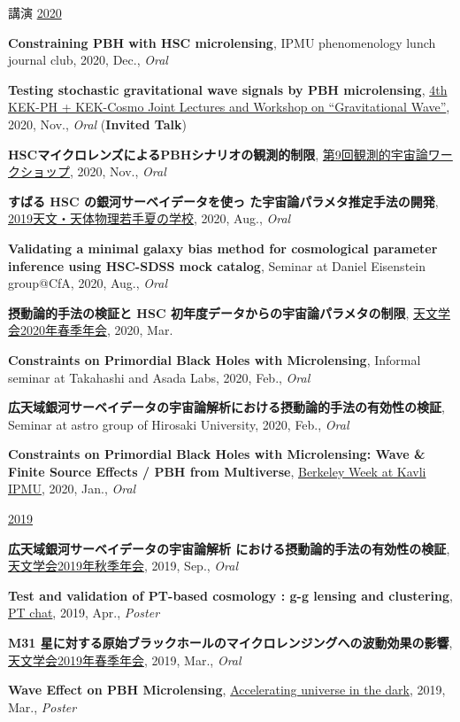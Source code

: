 \begin{rSection}{講演}
\underline{2020}
\begin{etaremune}
\setcounter{enumi}{16}
\item \textbf{Constraining PBH with HSC microlensing}, IPMU phenomenology lunch journal club, 2020, Dec., \textit{Oral}
\item \textbf{Testing stochastic gravitational wave signals by PBH microlensing}, \href{http://conference-indico.kek.jp/event/117/timetable/#day-2020-11-04}{4th KEK-PH + KEK-Cosmo Joint Lectures and Workshop on ``Gravitational Wave''}, 2020, Nov., \textit{Oral} (\textbf{Invited Talk})
\item \textbf{HSCマイクロレンズによるPBHシナリオの観測的制限}, \href{https://indico.ipmu.jp/event/382/timetable/#all}{第9回観測的宇宙論ワークショップ}, 2020, Nov., \textit{Oral}
\item \textbf{すばる HSC の銀河サーベイデータを使っ た宇宙論パラメタ推定手法の開発}, \href{http://www.astro-wakate.org/ss2019/web/}{2019天文・天体物理若手夏の学校}, 2020, Aug., \textit{Oral}
\item \textbf{Validating a minimal galaxy bias method for cosmological parameter inference using HSC-SDSS mock catalog}, Seminar at Daniel Eisenstein group@CfA, 2020, Aug., \textit{Oral}
\item \textbf{摂動論的手法の検証と HSC 初年度データからの宇宙論パラメタの制限}, \href{http://www.asj.or.jp/nenkai/archive/2020a/pdf/U03a.pdf}{天文学会2020年春季年会}, 2020, Mar.
\item \textbf{Constraints on Primordial Black Holes with Microlensing}, Informal seminar at Takahashi and Asada Labs, 2020, Feb., \textit{Oral}
\item \textbf{広天域銀河サーベイデータの宇宙論解析における摂動論的手法の有効性の検証}, Seminar at astro group of Hirosaki University, 2020, Feb., \textit{Oral}
\item \textbf{Constraints on Primordial Black Holes with Microlensing: Wave \& Finite Source Effects / PBH from Multiverse}, \href{http://indico.ipmu.jp/event/313/overview}{Berkeley Week at Kavli IPMU}, 2020, Jan., \textit{Oral}
\end{etaremune}

\underline{2019}
\begin{etaremune}
\setcounter{enumi}{7}
\item \textbf{広天域銀河サーベイデータの宇宙論解析 における摂動論的手法の有効性の検証}, \href{https://www.asj.or.jp/nenkai/archive/2019b/pdf/U20a.pdf}{天文学会2019年秋季年会}, 2019, Sep., \textit{Oral}
\item \textbf{Test and validation of PT-based cosmology : g-g lensing and clustering}, \href{http://pt-chat-kyoto.sciencesconf.org/}{PT chat}, 2019, Apr., \textit{Poster}
\item \textbf{M31 星に対する原始ブラックホールのマイクロレンジングへの波動効果の影響}, \href{https://www.asj.or.jp/nenkai/archive/2019a/pdf/U14a.pdf}{天文学会2019年春季年会}, 2019, Mar., \textit{Oral}
\item \textbf{Wave Effect on PBH Microlensing}, \href{http://www2.yukawa.kyoto-u.ac.jp/~aud2019/index.php}{Accelerating universe in the dark}, 2019, Mar., \textit{Poster}
\end{etaremune}


\end{rSection}
